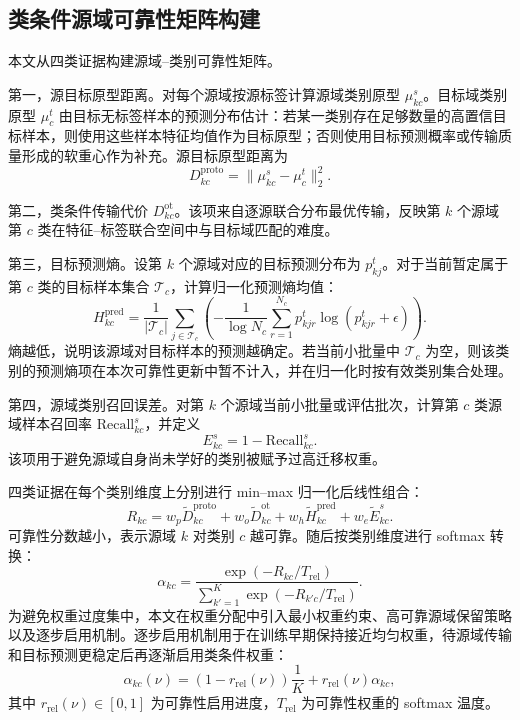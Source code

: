 \documentclass{seuthesis-2022}
\begin{document}
\subsection{类条件源域可靠性矩阵构建}

本文从四类证据构建源域--类别可靠性矩阵。

第一，源目标原型距离。对每个源域按源标签计算源域类别原型 $\mu_{kc}^s$。目标域类别原型 $\mu_c^t$ 由目标无标签样本的预测分布估计：若某一类别存在足够数量的高置信目标样本，则使用这些样本特征均值作为目标原型；否则使用目标预测概率或传输质量形成的软重心作为补充。源目标原型距离为
\begin{equation}
    D_{kc}^{\mathrm{proto}}
    =
    \|\mu_{kc}^s-\mu_c^t\|_2^2.
\end{equation}

第二，类条件传输代价 $D_{kc}^{\mathrm{ot}}$。该项来自逐源联合分布最优传输，反映第 $k$ 个源域第 $c$ 类在特征--标签联合空间中与目标域匹配的难度。

第三，目标预测熵。设第 $k$ 个源域对应的目标预测分布为 $p_{kj}^t$。对于当前暂定属于第 $c$ 类的目标样本集合 $\mathcal{T}_c$，计算归一化预测熵均值：
\begin{equation}
    H_{kc}^{\mathrm{pred}}
    =
    \frac{1}{|\mathcal{T}_c|}
    \sum_{j\in\mathcal{T}_c}
    \left(
    -\frac{1}{\log N_c}
    \sum_{r=1}^{N_c}
    p_{kjr}^t\log(p_{kjr}^t+\epsilon)
    \right).
\end{equation}
熵越低，说明该源域对目标样本的预测越确定。若当前小批量中 $\mathcal{T}_c$ 为空，则该类别的预测熵项在本次可靠性更新中暂不计入，并在归一化时按有效类别集合处理。

第四，源域类别召回误差。对第 $k$ 个源域当前小批量或评估批次，计算第 $c$ 类源域样本召回率 $\mathrm{Recall}_{kc}^{s}$，并定义
\begin{equation}
    E_{kc}^{s}
    =
    1-\mathrm{Recall}_{kc}^{s}.
\end{equation}
该项用于避免源域自身尚未学好的类别被赋予过高迁移权重。

四类证据在每个类别维度上分别进行 min--max 归一化后线性组合：
\begin{equation}
    R_{kc}
    =
    w_p\widetilde{D}_{kc}^{\mathrm{proto}}
    +
    w_o\widetilde{D}_{kc}^{\mathrm{ot}}
    +
    w_h\widetilde{H}_{kc}^{\mathrm{pred}}
    +
    w_e\widetilde{E}_{kc}^{s}.
\end{equation}
可靠性分数越小，表示源域 $k$ 对类别 $c$ 越可靠。随后按类别维度进行 softmax 转换：
\begin{equation}
    \alpha_{kc}
    =
    \frac{
    \exp(-R_{kc}/T_{\mathrm{rel}})
    }{
    \sum_{k'=1}^{K}
    \exp(-R_{k'c}/T_{\mathrm{rel}})
    }.
\end{equation}
为避免权重过度集中，本文在权重分配中引入最小权重约束、高可靠源域保留策略以及逐步启用机制。逐步启用机制用于在训练早期保持接近均匀权重，待源域传输和目标预测更稳定后再逐渐启用类条件权重：
\begin{equation}
    \alpha_{kc}(\nu)
    =
    (1-r_{\mathrm{rel}}(\nu))\frac{1}{K}
    +
    r_{\mathrm{rel}}(\nu)\alpha_{kc},
\end{equation}
其中 $r_{\mathrm{rel}}(\nu)\in[0,1]$ 为可靠性启用进度，$T_{\mathrm{rel}}$ 为可靠性权重的 softmax 温度。
\end{document}
